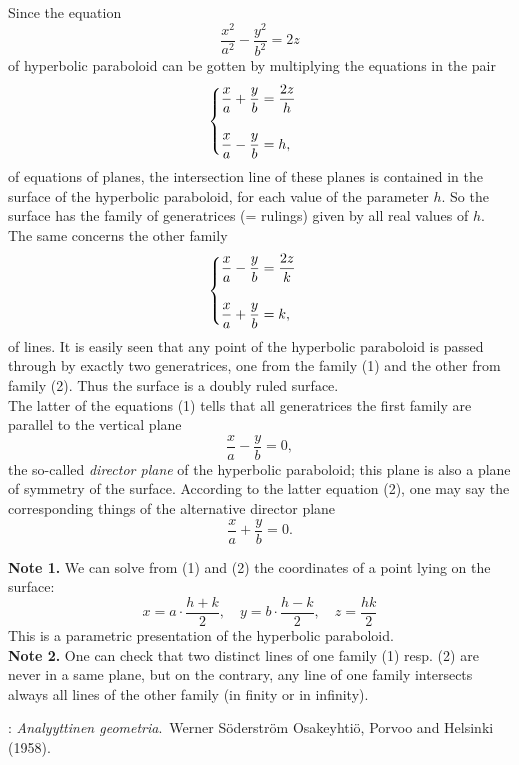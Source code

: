 \documentclass[12pt]{article}
\theoremstyle{definition}
\begin{document}
Since the equation
$$\frac{x^2}{a^2}-\frac{y^2}{b^2} = 2z$$
of hyperbolic paraboloid can be gotten by multiplying the equations in the pair 
\begin{align}
\begin{cases}
      \displaystyle{\frac{x}{a}+\frac{y}{b} = \frac{2z}{h}} \vspace{15pt} \\ 
      \displaystyle{\frac{x}{a}-\frac{y}{b} = h},
\end{cases}
\end{align}
of equations of planes, the intersection line of these planes is contained in the surface of the hyperbolic paraboloid, for each value of the parameter $h$.  So the surface has the family of generatrices (= rulings) given by all real values of $h$.  The same concerns the other family 
\begin{align}
\begin{cases}
      \displaystyle{\frac{x}{a}-\frac{y}{b} = \frac{2z}{k}} \vspace{15pt}\\  
      \displaystyle{\frac{x}{a}+\frac{y}{b} = k,}
\end{cases}
\end{align}
of lines.  It is easily seen that any point of the hyperbolic paraboloid is passed through by exactly two generatrices, one from the family (1) and the other from family (2).  Thus the surface is a doubly ruled surface.\\

The latter of the equations (1) tells that all generatrices the first family are parallel to the vertical plane
$$\frac{x}{a}-\frac{y}{b} = 0,$$
the so-called {\em director plane} of the hyperbolic paraboloid; this plane is also a plane of symmetry of the surface.  According to the latter equation (2), one may say the corresponding things of the alternative director plane
$$\frac{x}{a}+\frac{y}{b} = 0.$$

\textbf{Note 1.}  We can solve from (1) and (2) the coordinates of a point lying on the surface:
$$x = a\!\cdot\!\frac{h\!+\!k}{2},\quad y = b\!\cdot\!\frac{h\!-\!k}{2},\quad z = \frac{hk}{2}$$
This is a parametric presentation of the hyperbolic paraboloid.\\

\textbf{Note 2.}  One can check that two distinct lines of one family (1) resp. (2) are never in a same plane, but on the contrary, any line of one family intersects always all lines of the other family (in finity or in infinity).

\begin{thebibliography}{8}
: {\em Analyyttinen geometria}.\, Werner S\"oderstr\"om Osakeyhti\"o, Porvoo and Helsinki (1958).
\end{thebibliography}



\end{document}

